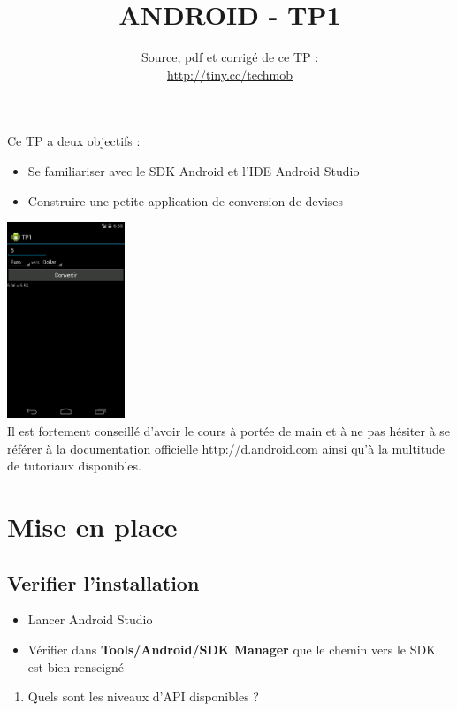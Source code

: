 \documentclass{article}
\title{ANDROID - TP1}
\date{Source, pdf et corrigé de ce TP
:\\\href{http://tiny.cc/techmob}{http://tiny.cc/techmob}}
\begin{document}
\maketitle
Ce TP a deux objectifs :
\begin{itemize}
\item Se familiariser avec le SDK Android et l'IDE Android Studio
\item Construire une petite application de conversion de devises
\end{itemize}
\includegraphics[width=100pt]{img/tp1.png}\\
Il est fortement conseillé d'avoir le cours à portée de main et à ne pas hésiter
à se référer à la documentation officielle
\href{http://d.android.com}{http://d.android.com} ainsi qu'à la multitude de
tutoriaux disponibles.
\section{Mise en place}
\subsection{Verifier l'installation}
\begin{itemize}
\item Lancer Android Studio
\item Vérifier dans \textbf{Tools/Android/SDK Manager} que le chemin vers le SDK
est bien renseigné
\end{itemize}
\begin{enumerate}
\item Quels sont les niveaux d'API disponibles ?
\end{enumerate}
\end{document}
